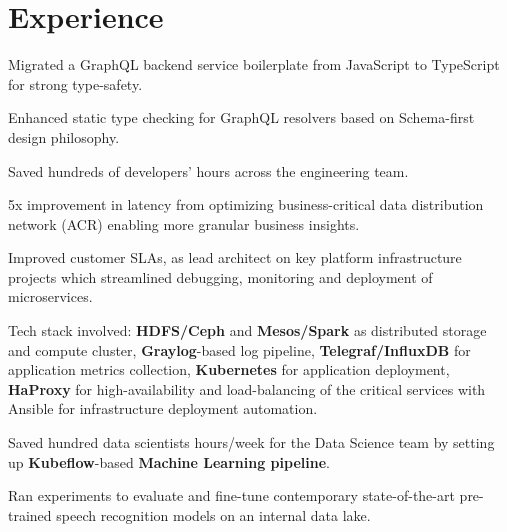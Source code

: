 \documentclass[]{deedy-resume-openfont}
\begin{document}
\hfill
\begin{minipage}[t]{0.66\textwidth} 


\section{Experience}
\vspace{\topsep}
\begin{tightemize}
\item Migrated a GraphQL backend service boilerplate from JavaScript to TypeScript for strong type-safety.
\item Enhanced static type checking for GraphQL resolvers based on Schema-first design philosophy.
\item Saved hundreds of developers' hours across the engineering team.
\end{tightemize}
\sectionsep
{}
\begin{tightemize}
\item 5x improvement in latency from optimizing business-critical data distribution network (ACR) enabling more granular business insights.
\item Improved customer SLAs, as lead architect on key platform infrastructure projects which streamlined debugging, monitoring and deployment of microservices. 
\item Tech stack involved: \textbf{HDFS/Ceph} and \textbf{Mesos/Spark} as distributed storage and compute cluster, \textbf{Graylog}-based log pipeline, \textbf{Telegraf/InfluxDB} for application metrics collection, \textbf{Kubernetes} for application deployment, \textbf{HaProxy} for high-availability and load-balancing of the critical services with Ansible for infrastructure deployment automation.
\item Saved hundred data scientists hours/week for the Data Science team by setting up \textbf{Kubeflow}-based \textbf{Machine Learning pipeline}.
\item Ran experiments to evaluate and fine-tune contemporary state-of-the-art pre-trained speech recognition models on an internal data lake.
\end{tightemize}
\sectionsep


\end{minipage}
\end{document}
